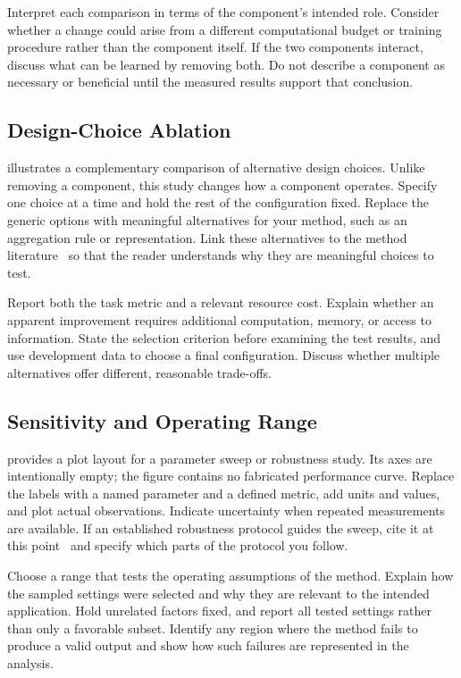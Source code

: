 

Interpret each comparison in terms of the component's intended role.
Consider whether a change could arise from a different computational budget
or training procedure rather than the component itself. If the two
components interact, discuss what can be learned by removing both.
Do not describe a component as necessary or beneficial until the measured
results support that conclusion.

\subsection{Design-Choice Ablation}
 illustrates a complementary comparison of
alternative design choices. Unlike removing a component, this study changes
how a component operates. Specify one choice at a time and hold the rest of
the configuration fixed. Replace the generic options with meaningful
alternatives for your method, such as an aggregation rule or representation.
Link these alternatives to the method literature~\cite{representation,hybrid}
so that the reader understands why they are meaningful choices to test.



Report both the task metric and a relevant resource cost. Explain whether
an apparent improvement requires additional computation, memory, or access
to information. State the selection criterion before examining the test
results, and use development data to choose a final configuration. Discuss
whether multiple alternatives offer different, reasonable trade-offs.

\subsection{Sensitivity and Operating Range}
 provides a plot layout for a parameter sweep
or robustness study. Its axes are intentionally empty; the figure contains
no fabricated performance curve. Replace the labels with a named parameter
and a defined metric, add units and values, and plot actual observations.
Indicate uncertainty when repeated measurements are available.
If an established robustness protocol guides the sweep, cite it at this
point~\cite{robustness} and specify which parts of the protocol you follow.



Choose a range that tests the operating assumptions of the method. Explain
how the sampled settings were selected and why they are relevant to the
intended application. Hold unrelated factors fixed, and report all tested
settings rather than only a favorable subset. Identify any region where
the method fails to produce a valid output and show how such failures are
represented in the analysis.

